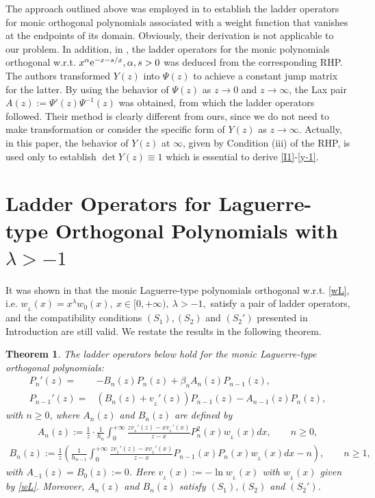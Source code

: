 \documentclass[12pt,a4paper]{article}    %
\newtheorem{theorem}{Theorem}[section]
\newcommand{\e}{{\rm e}}
\numberwithin{equation}{section}
\begin{document}
The approach outlined above was employed in \cite{WvA18} to establish the ladder operators for monic orthogonal polynomials associated with a weight function that vanishes at the endpoints of its domain. Obviously, their derivation is not applicable to our problem. In addition, in \cite{ChenIts2010}, the ladder operators for the monic polynomials orthogonal w.r.t. $x^{\alpha}\e^{-x-s/x}, \alpha,s>0$ was deduced from the corresponding RHP. The authors transformed $Y(z)$ into $\Psi(z)$ to achieve a constant jump matrix for the latter. By using the behavior of $\Psi(z)$ as $z\rightarrow0$ and $z\rightarrow\infty$, the Lax pair $A(z):=\Psi'(z)\Psi^{-1}(z)$ was obtained, from which the ladder operators followed. Their method is clearly different from ours, since we do not need to make transformation or consider the specific form of $Y(z)$ as $z\rightarrow\infty$. Actually, in this paper, the behavior of $Y(z)$ at $\infty$, given by Condition (iii) of the RHP, is used only to establish $\det Y(z)\equiv1$ which is essential to derive \eqref{I1}-\eqref{y-1}.


\section{Ladder Operators for Laguerre-type Orthogonal Polynomials with $\lambda>-1$}
It was shown in \cite{MinFang25} that the monic Laguerre-type polynomials orthogonal w.r.t. \eqref{wL}, i.e. $w_{_L}(x)=x^\lambda w_0(x),~ x\in [0, +\infty),~ \lambda>-1,$ satisfy a pair of ladder operators, and the compatibility conditions $(S_1), (S_2)$ and $(S_2')$ presented in Introduction are still valid. We restate the results in the following theorem.
\begin{theorem}\label{main}
The ladder operators below hold for the monic Laguerre-type orthogonal polynomials:
\begin{align}
P_n'(z)=&-B_n(z)P_n(z)+\beta_nA_n(z)P_{n-1}(z),\label{lo}\\
P_{n-1}'(z)=&\left(B_n(z)+v_{_L}'(z)\right)P_{n-1}(z)-A_{n-1}(z)P_n(z),\label{ro}
\end{align}
with $n\geq0$, where $A_n(z)$ and $B_n(z)$ are defined by
     \begin{align}\label{AN}	 A_n(z):=\frac{1}{z}\cdot\frac{1}{h_{n}}\int_{0}^{+\infty}\frac{zv_{_L}'(z)-xv_{_L}'(x)}{z-x}P_n^{2}(x)w_{_L}(x)dx,\qquad n\geq0,
     \end{align}
     \begin{align}\label{BN}
      B_n(z):=\frac{1}{z}\left(\frac{1}{h_{n-1}}\int_{0}^{+\infty}\frac{zv_{_L}'(z)-xv_{_L}'(x)}{z-x}P_{n-1}(x)P_n(x)w_{_L}(x)dx
     -n\right),\qquad n\geq1,
     \end{align}
with $A_{-1}(z)=B_0(z):=0$. Here $v_{_L}(x):=-\ln w_{_L}(x)$ with $w_{_L}(x)$ given by \eqref{wL}. Moreover, $A_n(z)$ and $B_n(z)$ satisfy $(S_1), (S_2)$ and $(S_2')$.
\end{theorem}
      	
\end{document}

